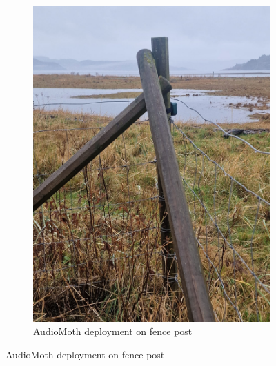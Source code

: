 \documentclass[twocolumn]{article}
\begin{document}
\begin{figure}[h]
\begin{subfigure}{0.31\textwidth}
\includegraphics[width=\textwidth]{03_deployment_location_fence.jpg}
\caption{AudioMoth deployment on fence post}
\end{subfigure}

\vspace{0.3cm}


\end{figure}
\end{document}
